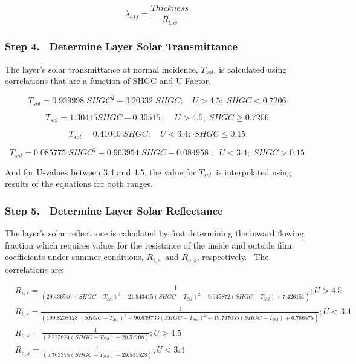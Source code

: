 \begin{equation}
{\lambda_{eff}} = \frac{{Thickness}}{{{R_{l,w}}}}
\end{equation}

\subsubsection{Step 4.~ Determine Layer Solar Transmittance}\label{step-4.-determine-layer-solar-transmittance}

The layer's solar transmittance at normal incidence, \({T_{sol}}\), is calculated using correlations that are a function of SHGC and U-Factor.

\begin{equation}
{T_{sol}} = 0.939998\;SHG{C^2} + 0.20332\;SHGC;\quad U > 4.5;\;SHGC < 0.7206
\end{equation}

\begin{equation}
{T_{sol}} = 1.30415SHGC - 0.30515\;;\quad U > 4.5;\;SHGC \ge 0.7206
\end{equation}

\begin{equation}
{T_{sol}} = 0.41040\;SHGC;\quad U < 3.4;\;SHGC \le 0.15
\end{equation}

\begin{equation}
{T_{sol}} = 0.085775\;SHG{C^2} + 0.963954\;SHGC - 0.084958\;;\;\;U < 3.4;\;SHGC > 0.15
\end{equation}

And for U-values between 3.4 and 4.5, the value for \({T_{sol}}\)~is interpolated using results of the equations for both ranges.

\subsubsection{Step 5.~ Determine Layer Solar Reflectance}\label{step-5.-determine-layer-solar-reflectance}

The layer's solar reflectance is calculated by first determining the inward flowing fraction which requires values for the resistance of the inside and outside film coefficients under summer conditions, \({R_{i,s}}\)~and \({R_{o,s}}\), respectively.~ The correlations are:

{\scriptsize
\begin{equation}
\begin{split}
&{R_{i,s}} = \frac{1}{{\left( {29.436546\;{{\left( {SHGC - {T_{Sol}}} \right)}^3} - 21.943415{{\left( {SHGC - {T_{Sol}}} \right)}^2} + 9.945872\left( {SHGC - {T_{Sol}}} \right) + 7.426151} \right)}}; U > 4.5 \\
&{R_{i,s}} = \frac{1}{{\left( {199.8208128\;{{\left( {SHGC - {T_{Sol}}} \right)}^3} - 90.639733{{\left( {SHGC - {T_{Sol}}} \right)}^2} + 19.737055\left( {SHGC - {T_{Sol}}} \right) + 6.766575} \right)}}; U < 3.4 \\
&{R_{o,s}} = \frac{1}{{\left( {2.225824(SHGC - {T_{Sol}}) + 20.57708} \right)}}; U > 4.5 \\
&{R_{o,s}} = \frac{1}{{\left( {5.763355(SHGC - {T_{Sol}}) + 20.541528} \right)}}; U < 3.4
\end{split}
\end{equation}}

